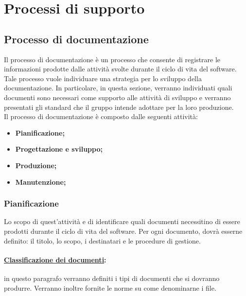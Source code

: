 \section{Processi di supporto}
\label{processisupporto}

\subsection{Processo di documentazione}
\label{processodocumentazione}
Il processo di documentazione è un processo che consente di registrare le informazioni prodotte dalle attività svolte durante il ciclo di vita del software. Tale processo vuole individuare una strategia per lo sviluppo della documentazione. In particolare, in questa sezione, verranno individuati quali documenti sono necessari come supporto alle attività di sviluppo e verranno presentati gli standard che il gruppo \authorName{} intende adottare per la loro produzione.\\
Il processo di documentazione è composto dalle seguenti attività:
\begin{itemize}
\item \textbf{Pianificazione;}
\item \textbf{Progettazione e sviluppo;}
\item \textbf{Produzione;}
\item \textbf{Manutenzione;}
\end{itemize}

\subsubsection{Pianificazione}
\label{pianificazionedocumenti}
Lo scopo di quest'attività e di identificare quali documenti necessitino di essere prodotti durante il ciclo di vita del software. Per ogni documento, dovrà esserne definito: il titolo, lo scopo, i destinatari e le procedure di gestione.

\paragraph{\underline{Classificazione dei documenti}:} in questo paragrafo verranno definiti i tipi di documenti che si dovranno produrre. Verranno inoltre fornite le norme su come denominarne i file.

